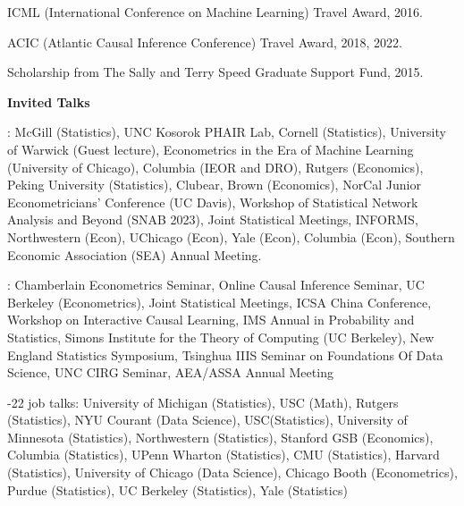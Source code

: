 \documentclass{article}
\begin{document}
\vspace{2mm}
ICML (International Conference on Machine Learning) Travel Award, 2016.

\vspace{2mm}
ACIC (Atlantic Causal Inference Conference) Travel Award, 2018, 2022.

\vspace{2mm}
Scholarship from The Sally and Terry Speed Graduate Support Fund, 2015.

\vspace{5mm}

\begin{large}
\noindent \textbf{Invited Talks}
\end{large}

\vspace{4mm}
: McGill (Statistics), UNC Kosorok PHAIR Lab, Cornell (Statistics), University of Warwick (Guest lecture), Econometrics in the Era of Machine Learning (University of Chicago), Columbia (IEOR and DRO), Rutgers (Economics), Peking University (Statistics), Clubear, Brown (Economics), NorCal Junior Econometricians' Conference (UC Davis), Workshop of Statistical Network Analysis and Beyond (SNAB 2023), Joint Statistical Meetings, INFORMS, Northwestern (Econ), UChicago (Econ), Yale (Econ), Columbia (Econ), Southern Economic Association (SEA) Annual Meeting.

\vspace{4mm}
: Chamberlain Econometrics Seminar, Online Causal Inference Seminar, UC Berkeley (Econometrics), Joint Statistical Meetings, ICSA China Conference, Workshop on Interactive Causal Learning, IMS Annual in Probability and Statistics, Simons Institute for the Theory of Computing (UC Berkeley), New England Statistics Symposium, Tsinghua IIIS Seminar on Foundations Of Data Science, UNC CIRG Seminar, AEA/ASSA Annual Meeting

\vspace{4mm}
-22 job talks: University of Michigan (Statistics), USC (Math), Rutgers (Statistics), NYU Courant (Data Science), USC(Statistics), University of Minnesota (Statistics), Northwestern (Statistics), Stanford GSB (Economics), Columbia (Statistics), UPenn Wharton (Statistics), CMU (Statistics), Harvard (Statistics), University of Chicago (Data Science), Chicago Booth (Econometrics), Purdue (Statistics), UC Berkeley (Statistics), Yale (Statistics)
\end{document}
